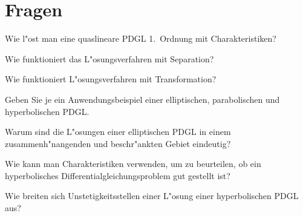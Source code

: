 \documentclass[a4paper,12pt,twocolumn]{article}
\begin{document}
\section{Fragen}
\begin{compactenum}
\item Wie l"ost man eine quaslineare PDGL 1.~Ordnung mit Charakteristiken?
\item Wie funktioniert das L"osungsverfahren mit Separation?
\item Wie funktioniert L"osungsverfahren mit Transformation?
\item Geben Sie je ein Anwendungsbeispiel einer elliptischen, parabolischen und
hyperbolischen PDGL.
\item Warum sind die L"osungen einer elliptischen PDGL in einem
zusammenh"nangenden und beschr"ankten Gebiet eindeutig?
\item Wie kann man Charakteristiken verwenden, um zu beurteilen, ob ein
hyperbolisches Differentialgleichungsproblem gut gestellt ist?
\item Wie breiten sich Unstetigkeitsstellen einer L"osung einer
hyperbolischen PDGL aus?
\end{compactenum}
\vfill
\end{document}
